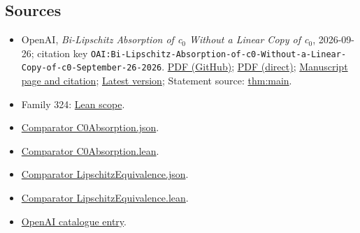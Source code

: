 \documentclass[11pt]{article}
\begin{document}
\subsection{Sources}
\begin{itemize}
\item OpenAI, \emph{Bi-Lipschitz Absorption of c\({}_{0}\) Without a Linear Copy of c\({}_{0}\)}, 2026-09-26; citation key \texttt{OAI:Bi-Lipschitz-Absorption-of-c0-Without-a-Linear-Copy-of-c0-September-26-2026}. \href{https://github.com/openai/math/blob/adc7f1241b42e322a6451854ab7e4b4c146bf78a/preprints/Bi-Lipschitz-Absorption-of-c0-Without-a-Linear-Copy-of-c0-September-26-2026/paper.pdf}{PDF (GitHub)}; \href{https://github.com/openai/math/raw/adc7f1241b42e322a6451854ab7e4b4c146bf78a/preprints/Bi-Lipschitz-Absorption-of-c0-Without-a-Linear-Copy-of-c0-September-26-2026/paper.pdf}{PDF (direct)}; \href{https://github.com/openai/math/blob/adc7f1241b42e322a6451854ab7e4b4c146bf78a/preprints/Bi-Lipschitz-Absorption-of-c0-Without-a-Linear-Copy-of-c0-September-26-2026/README.md}{Manuscript page and citation}; \href{https://github.com/openai/math/blob/main/preprints/Bi-Lipschitz-Absorption-of-c0-Without-a-Linear-Copy-of-c0-September-26-2026/paper.pdf}{Latest version}; Statement source: \href{https://github.com/openai/math/blob/adc7f1241b42e322a6451854ab7e4b4c146bf78a/preprints/Bi-Lipschitz-Absorption-of-c0-Without-a-Linear-Copy-of-c0-September-26-2026/build/sections/01-introduction.tex\#L51}{thm:main}.
\item Family 324: \href{https://github.com/openai/math/blob/adc7f1241b42e322a6451854ab7e4b4c146bf78a/lean/docs/324.md}{Lean scope}.
\item \href{https://github.com/openai/math/blob/adc7f1241b42e322a6451854ab7e4b4c146bf78a/lean/ComparatorChallenges/C0Absorption.json}{Comparator C0Absorption.json}.
\item \href{https://github.com/openai/math/blob/adc7f1241b42e322a6451854ab7e4b4c146bf78a/lean/ComparatorChallenges/C0Absorption.lean}{Comparator C0Absorption.lean}.
\item \href{https://github.com/openai/math/blob/adc7f1241b42e322a6451854ab7e4b4c146bf78a/lean/ComparatorChallenges/LipschitzEquivalence.json}{Comparator LipschitzEquivalence.json}.
\item \href{https://github.com/openai/math/blob/adc7f1241b42e322a6451854ab7e4b4c146bf78a/lean/ComparatorChallenges/LipschitzEquivalence.lean}{Comparator LipschitzEquivalence.lean}.
\item \href{https://github.com/openai/math/blob/adc7f1241b42e322a6451854ab7e4b4c146bf78a/CONTENTS.md}{OpenAI catalogue entry}.
\end{itemize}
\end{document}
